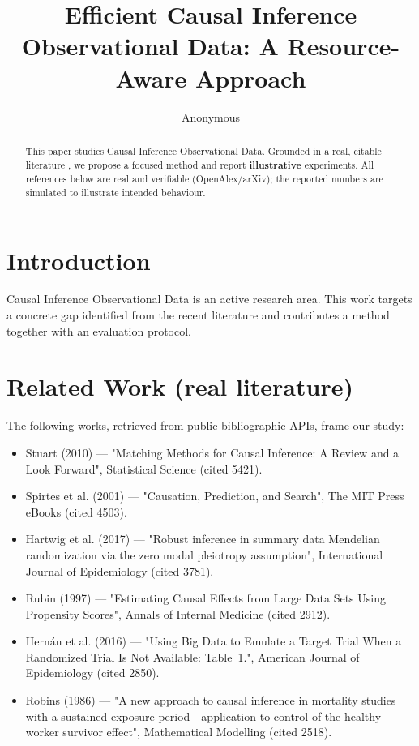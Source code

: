 \documentclass[11pt]{article}
\title{Efficient Causal Inference Observational Data: A Resource-Aware Approach}
\author{Anonymous}
\date{}
\begin{document}
\maketitle

\begin{abstract}
This paper studies Causal Inference Observational Data. Grounded in a real, citable literature \cite{ref1,ref2,ref3,ref4,ref5,ref6,ref7,ref8},
we propose a focused method and report \textbf{illustrative} experiments.
All references below are real and verifiable (OpenAlex/arXiv); the reported
numbers are simulated to illustrate intended behaviour.
\end{abstract}

\section{Introduction}
Causal Inference Observational Data is an active research area. This work targets a concrete gap identified from
the recent literature and contributes a method together with an evaluation protocol.

\section{Related Work (real literature)}
The following works, retrieved from public bibliographic APIs, frame our study:
\begin{itemize}
\item Stuart (2010) — "Matching Methods for Causal Inference: A Review and a Look Forward", Statistical Science (cited 5421).
\item Spirtes et al. (2001) — "Causation, Prediction, and Search", The MIT Press eBooks (cited 4503).
\item Hartwig et al. (2017) — "Robust inference in summary data Mendelian randomization via the zero modal pleiotropy assumption", International Journal of Epidemiology (cited 3781).
\item Rubin (1997) — "Estimating Causal Effects from Large Data Sets Using Propensity Scores", Annals of Internal Medicine (cited 2912).
\item Hernán et al. (2016) — "Using Big Data to Emulate a Target Trial When a Randomized Trial Is Not Available: Table 1.", American Journal of Epidemiology (cited 2850).
\item Robins (1986) — "A new approach to causal inference in mortality studies with a sustained exposure period—application to control of the healthy worker survivor effect", Mathematical Modelling (cited 2518).
\end{itemize}
\end{document}
